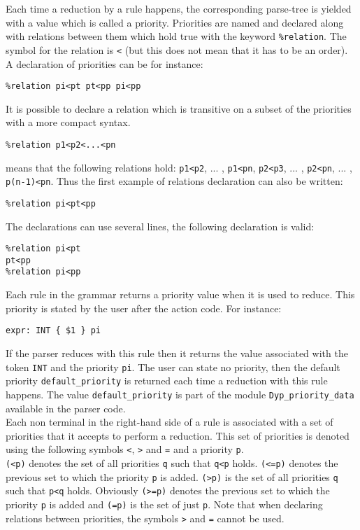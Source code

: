 \documentclass[12pt]{article}
\begin{document}
{Each time a reduction by a rule happens, the corresponding parse-tree is yielded with a value which is called a priority.
Priorities are named and declared along with relations between them which hold true with the keyword \texttt{\%relation}. The symbol for the relation is \texttt{<} (but this does not mean that it has to be an order). A declaration of priorities can be for instance:
\begin{verbatim}
%relation pi<pt pt<pp pi<pp
\end{verbatim}
It is possible to declare a relation which is transitive on a subset of the priorities with a more compact syntax.
\begin{verbatim}
%relation p1<p2<...<pn
\end{verbatim}
means that the following relations hold: \texttt{p1<p2}, ... , \texttt{p1<pn}, \texttt{p2<p3}, ... , \texttt{p2<pn}, ... , \texttt{p(n-1)<pn}. Thus the first example of relations declaration can also be written:
\begin{verbatim}
%relation pi<pt<pp
\end{verbatim}
The declarations can use several lines, the following declaration is valid:
\begin{verbatim}
%relation pi<pt
pt<pp
%relation pi<pp
\end{verbatim}

Each rule in the grammar returns a priority value when it is used to reduce. This priority is stated by the user after the action code. For instance:
\begin{verbatim}
expr: INT { $1 } pi
\end{verbatim}
If the parser reduces with this rule then it returns the value associated with the token \texttt{INT} and the priority \texttt{pi}. The user can state no priority, then the default priority \texttt{default\_priority} is returned each time a reduction with this rule happens. The value \verb|default_priority| is part of the module \verb|Dyp_priority_data| available in the parser code.\\

Each non terminal in the right-hand side of a rule is associated with a set of priorities that it accepts to perform a reduction. This set of priorities is denoted using the following symbols \texttt{<}, \texttt{>} and \texttt{=} and a priority \texttt{p}.\\

\texttt{(<p)} denotes the set of all priorities \texttt{q} such that \texttt{q<p} holds. \texttt{(<=p)} denotes the previous set to which the priority \texttt{p} is added. \texttt{(>p)} is the set of all priorities \texttt{q} such that \texttt{p<q} holds. Obviously \texttt{(>=p)} denotes the previous set to which the priority \texttt{p} is added and \texttt{(=p)} is the set of just \texttt{p}. Note that when declaring relations between priorities, the symbols \texttt{>} and \texttt{=} cannot be used.\\

}
\end{document}
